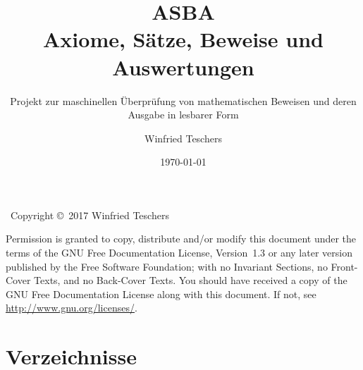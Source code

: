 \titlehead{
	{\Large Dr. Winfried Teschers}\\
	Anton-Günther-Straße 26c\\91083 Baiersdorf\\
	{\footnotesize winfried.teschers@t-online.de}
}
\subject{Projektdokument}
\title{{\Huge ASBA}\\Axiome, Sätze, Beweise und Auswertungen}
\subtitle{Projekt zur maschinellen Überprüfung von mathematischen Beweisen und deren Ausgabe in lesbarer Form}
\author{Winfried Teschers}
\date{\today}
\publishers{\vspace{1cm}\normalsize
	Es wird ein Programmsystem beschrieben, das zu eingegebenen Axiomen, Sätzen, und Beweisen letztere prüft, Auswertungen generiert und zu gegebenen Ausgabeschemata eine Ausgabe der Elemente in üblicher Formelschreibweise im \LaTeX-Format erstellt.
}



	\maketitle

	~\vfill Copyright \copyright\ 2017 Winfried Teschers\bigskip

	Permission is granted to copy, distribute and/or modify this document under the terms of the GNU Free Documentation License, Version~1.3 or any later version published by the Free Software Foundation; with no Invariant Sections, no Front-Cover Texts, and no Back-Cover Texts.
	You should have received a copy of the GNU Free Documentation License along with this document.
	If not, see \url{http://www.gnu.org/licenses/}.

	\tableofcontents
	\Endchapter

	
	
	
	

	\chapter{Verzeichnisse}%
	\label{cha:Verzeichnisse}

	\likechapter[section]{\listtablename}
	\begin{minipage}{\linewidth-10.95pt}
		\label{dic:Tabellenverzeichnis}
		\listoftables
	\end{minipage}
	\Endchapter

